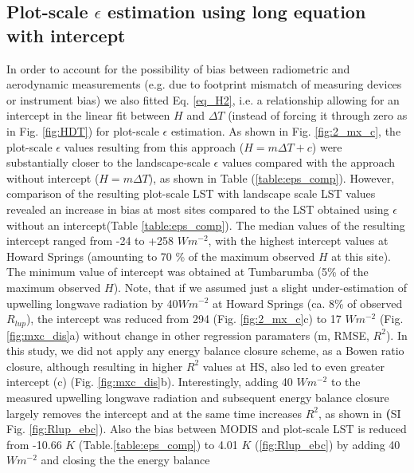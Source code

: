 \documentclass[fleqn,10pt]{wlscirep}
\begin{document}
\subsection{Plot-scale $\epsilon$ estimation using long equation with intercept}
In order to account for the possibility of bias between radiometric and aerodynamic measurements (e.g. due to footprint mismatch of measuring devices or instrument bias) we also fitted Eq. \ref{eq_H2}, i.e. a relationship allowing for an intercept in the linear fit between $H$ and $\Delta T$ (instead of forcing it through zero as in Fig. \ref{fig:HDT}) for plot-scale $\epsilon$ estimation. As shown in Fig. \ref{fig:2_mx_c}, the plot-scale $\epsilon$ values resulting from this approach ($H=m \Delta T + c$) were substantially closer to the landscape-scale $\epsilon$ values compared with the approach without intercept ($H=m \Delta T$), as shown in Table (\ref{table:eps_comp}). However, comparison of the resulting plot-scale LST with landscape scale LST values revealed an increase in bias at most sites compared to the LST obtained using $\epsilon$ without an intercept(Table \ref{table:eps_comp}). The median values of the resulting intercept ranged from -24 to +258 $Wm^{-2}$, with the highest intercept values at Howard Springs (amounting to 70 \% of the maximum observed $H$ at this site). The minimum value of intercept was obtained at Tumbarumba (5\% of the maximum observed $H$). Note, that if we assumed just a slight under-estimation of upwelling longwave radiation by 40$Wm^{-2}$ at Howard Springs (ca. 8\% of observed $R_{lup}$), the intercept was reduced from 294 (Fig. \ref{fig:2_mx_c}c) to 17  $Wm^{-2}$ (Fig. \ref{fig:mxc_dis}a) without change in other regression paramaters (m, RMSE, $R^{2}$). In this study, we did not apply any energy balance closure scheme, as a Bowen ratio closure, although resulting in higher $R^{2}$ values at HS, also led to even greater intercept (c) (Fig. \ref{fig:mxc_dis}b). 
Interestingly, adding 40 $Wm^{-2}$ to the  measured upwelling longwave radiation and subsequent energy balance closure largely removes the intercept and at the same time increases $R^2$, as shown in \textbf(SI Fig. \ref{fig:Rlup_ebc}). Also the bias between MODIS and plot-scale LST is reduced from -10.66 $K$ (Table.\ref{table:eps_comp}) to 4.01 $K$ (\ref{fig:Rlup_ebc}) by adding 40 $Wm^{-2}$ and closing the the energy balance 
\end{document}
